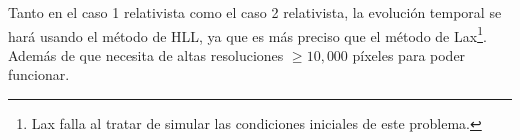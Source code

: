 \documentclass[12pt,a4paper]{book}
\begin{document}
Tanto en el caso 1 relativista como el caso 2 relativista, la evolución temporal se hará usando 
el método de HLL, ya que es más preciso que el método de Lax\footnote{
  Lax falla al tratar de simular las condiciones iniciales de este problema.
}. 
Además de que necesita de altas resoluciones $\geq 10,000$ píxeles para poder funcionar.

\begin{figure}
  \centering

\end{figure}
\end{document}
